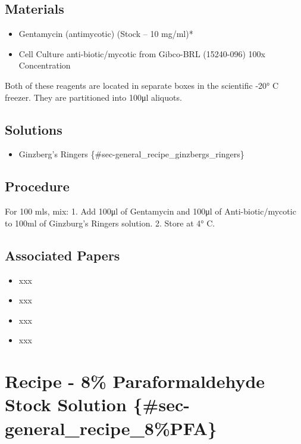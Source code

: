 \documentclass[
  letterpaper,
  DIV=11,
  numbers=noendperiod]{scrreprt}
\providecommand{\tightlist}{%
  \setlength{\itemsep}{0pt}\setlength{\parskip}{0pt}}\usepackage{longtable,booktabs,array}
\begin{document}
\hypertarget{materials-64}{%
\section{Materials}\label{materials-64}}

\begin{itemize}
\tightlist
\item
  Gentamycin (antimycotic) (Stock -- 10 mg/ml)*
\item
  Cell Culture anti-biotic/mycotic from Gibco-BRL (15240-096) 100x
  Concentration
\end{itemize}

Both of these reagents are located in separate boxes in the scientific
-20° C freezer. They are partitioned into 100μl aliquots.

\hypertarget{solutions-60}{%
\section{Solutions}\label{solutions-60}}

\begin{itemize}
\tightlist
\item
  Ginzberg's Ringers \{\#sec-general\_recipe\_ginzbergs\_ringers\}
\end{itemize}

\hypertarget{procedure-65}{%
\section{Procedure}\label{procedure-65}}

For 100 mls, mix: 1. Add 100μl of Gentamycin and 100μl of
Anti-biotic/mycotic to 100ml of Ginzburg's Ringers solution. 2. Store at
4° C.

\hypertarget{associated-papers-45}{%
\section{Associated Papers}\label{associated-papers-45}}

\begin{itemize}
\tightlist
\item
  xxx
\item
  xxx
\item
  xxx
\item
  xxx
\end{itemize}

\hypertarget{recipe---8-paraformaldehyde-stock-solution-sec-general_recipe_8pfa}{%
\chapter{Recipe - 8\% Paraformaldehyde Stock Solution
\{\#sec-general\_recipe\_8\%PFA\}}\label{recipe---8-paraformaldehyde-stock-solution-sec-general_recipe_8pfa}}
\end{document}
